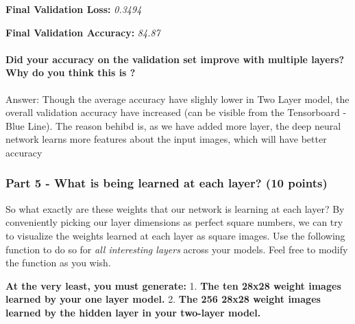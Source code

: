 \documentclass[11pt]{article}
\begin{document}
    \textbf{Final Validation Loss:} \emph{0.3494}

\textbf{Final Validation Accuracy:} \emph{84.87}

    \paragraph{Did your accuracy on the validation set improve with multiple
layers? Why do you think this is
?}\label{did-your-accuracy-on-the-validation-set-improve-with-multiple-layers-why-do-you-think-this-is}

Answer: Though the average accuracy have slighly lower in Two Layer
model, the overall validation accuracy have increased (can be visible
from the Tensorboard - Blue Line). The reason behibd is, as we have
added more layer, the deep neural network learns more features about the
input images, which will have better accuracy

    \subsubsection{Part 5 - What is being learned at each layer? (10
points)}\label{part-5---what-is-being-learned-at-each-layer-10-points}

So what exactly are these weights that our network is learning at each
layer? By conveniently picking our layer dimensions as perfect square
numbers, we can try to visualize the weights learned at each layer as
square images. Use the following function to do so for \emph{all
interesting layers} across your models. Feel free to modify the function
as you wish.

\textbf{At the very least, you must generate:} 1. \textbf{The ten 28x28
weight images learned by your one layer model.} 2. \textbf{The 256 28x28
weight images learned by the hidden layer in your two-layer model.}
\end{document}
